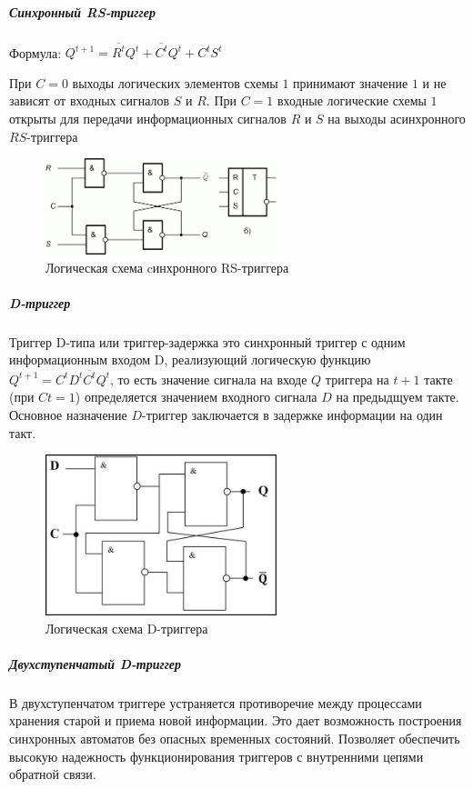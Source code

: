 \documentclass{article}
\begin{document}
\begin{flushleft}
\subparagraph{Синхронный RS-триггер}

Формула: $Q^{t + 1} = \overline{R^{t}} Q^{t} + \overline{C^{t}} Q^{t} + C^{t} S^{t}$

При $C = 0$ выходы логических элементов схемы $1$ принимают значение $1$ и не зависят от входных сигналов $S$ и $R$. При $C = 1$ входные логические схемы $1$ открыты для передачи информационных сигналов $R$ и $S$ на выходы асинхронного $RS$-триггера

\begin{figure}
\caption{Логическая схема cинхронного RS-триггера}
\includegraphics[width=0.6\textwidth]{assets/synchronous_rs.png}
\end{figure}

\pagebreak
\subparagraph{D-триггер}

Триггер D-типа или триггер-задержка это синхронный триггер с одним информационным входом D, реализующий логическую функцию $Q^{t + 1} = C^{t} D^{t} \overline{C^{t}} Q^{t}$, то есть значение сигнала на входе $Q$ триггера на $t + 1$ такте (при $Ct = 1$) определяется значением входного сигнала $D$ на предыдщуем такте. Основное назначение $D$-триггер заключается в задержке информации на один такт.

\begin{figure}
\caption{Логическая схема D-триггера}
\includegraphics[width=0.6\textwidth]{assets/d_trigger.jpg}
\end{figure}

\subparagraph{Двухступенчатый D-триггер}

В двухступенчатом триггере устраняется противоречие между процессами хранения старой и приема новой информации. Это дает возможность построения синхронных автоматов без опасных временных состояний. Позволяет обеспечить высокую надежность функционирования триггеров с внутренними цепями обратной связи.


\end{flushleft}
\end{document}
